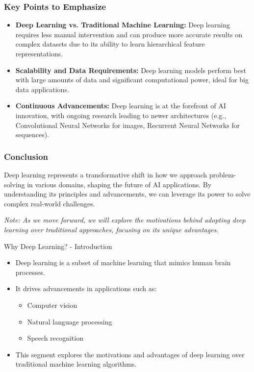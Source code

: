 \documentclass[aspectratio=169]{beamer}
\begin{document}
\begin{frame}[fragile]
    \frametitle{Key Points to Emphasize}
    
    \begin{itemize}
        \item \textbf{Deep Learning vs. Traditional Machine Learning:} 
        Deep learning requires less manual intervention and can produce more accurate results on complex datasets due to its ability to learn hierarchical feature representations.
        
        \item \textbf{Scalability and Data Requirements:} 
        Deep learning models perform best with large amounts of data and significant computational power, ideal for big data applications.
        
        \item \textbf{Continuous Advancements:} 
        Deep learning is at the forefront of AI innovation, with ongoing research leading to newer architectures (e.g., Convolutional Neural Networks for images, Recurrent Neural Networks for sequences).
    \end{itemize}
\end{frame}

\begin{frame}[fragile]
    \frametitle{Conclusion}
    Deep learning represents a transformative shift in how we approach problem-solving in various domains, shaping the future of AI applications. By understanding its principles and advancements, we can leverage its power to solve complex real-world challenges.

    \textit{Note: As we move forward, we will explore the motivations behind adopting deep learning over traditional approaches, focusing on its unique advantages.}
\end{frame}

\begin{frame}[fragile]{Why Deep Learning? - Introduction}
    \begin{itemize}
        \item Deep learning is a subset of machine learning that mimics human brain processes.
        \item It drives advancements in applications such as:
        \begin{itemize}
            \item Computer vision
            \item Natural language processing
            \item Speech recognition
        \end{itemize}
        \item This segment explores the motivations and advantages of deep learning over traditional machine learning algorithms.
    \end{itemize}
\end{frame}
\end{document}
